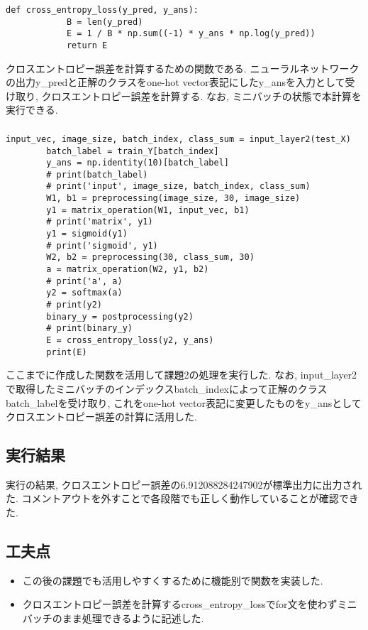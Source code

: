 \documentclass[a4j, titlepage]{jarticle}
\begin{document}
    \subsubsection*{}
        \begin{lstlisting}[caption=クロスエントロピー誤差の計算,label=fuga]
        def cross_entropy_loss(y_pred, y_ans):
            B = len(y_pred)
            E = 1 / B * np.sum((-1) * y_ans * np.log(y_pred))
            return E
        \end{lstlisting}
        クロスエントロピー誤差を計算するための関数である. ニューラルネットワークの出力y\_predと正解のクラスをone-hot vector表記にしたy\_ansを入力として受け取り, クロスエントロピー誤差を計算する. なお, ミニバッチの状態で本計算を実行できる.

    \subsubsection*{}
        \begin{lstlisting}[caption=課題2の実行,label=fuga]
        input_vec, image_size, batch_index, class_sum = input_layer2(test_X)
        batch_label = train_Y[batch_index]
        y_ans = np.identity(10)[batch_label]
        # print(batch_label)
        # print('input', image_size, batch_index, class_sum)
        W1, b1 = preprocessing(image_size, 30, image_size)
        y1 = matrix_operation(W1, input_vec, b1)
        # print('matrix', y1)
        y1 = sigmoid(y1)
        # print('sigmoid', y1)
        W2, b2 = preprocessing(30, class_sum, 30)
        a = matrix_operation(W2, y1, b2)
        # print('a', a)
        y2 = softmax(a)
        # print(y2)
        binary_y = postprocessing(y2)
        # print(binary_y)
        E = cross_entropy_loss(y2, y_ans)
        print(E)
        \end{lstlisting}
        ここまでに作成した関数を活用して課題2の処理を実行した.
        なお, input\_layer2で取得したミニバッチのインデックスbatch\_indexによって正解のクラスbatch\_labelを受け取り, これをone-hot vector表記に変更したものをy\_ansとしてクロスエントロピー誤差の計算に活用した.

\subsection*{実行結果}
    実行の結果, クロスエントロピー誤差の6.912088284247902が標準出力に出力された.
    コメントアウトを外すことで各段階でも正しく動作していることが確認できた.

\subsection*{工夫点}
    \begin{itemize}
        \item この後の課題でも活用しやすくするために機能別で関数を実装した.
        \item クロスエントロピー誤差を計算するcross\_entropy\_lossでfor文を使わずミニバッチのまま処理できるように記述した.
    \end{itemize}
\end{document}
